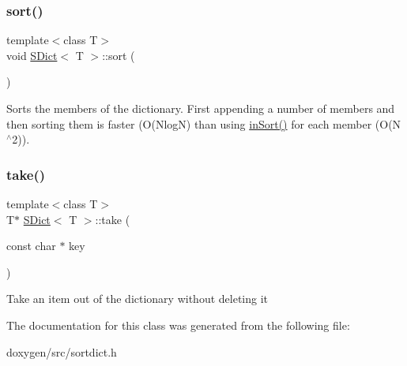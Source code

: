 \subsubsection{\texorpdfstring{sort()}{sort()}}
{\footnotesize\ttfamily template$<$class T$>$ \\
void \mbox{\hyperlink{class_s_dict}{S\+Dict}}$<$ T $>$\+::sort (\begin{DoxyParamCaption}{ }\end{DoxyParamCaption})\hspace{0.3cm}{\ttfamily [inline]}}

Sorts the members of the dictionary. First appending a number of members and then sorting them is faster (O(\+Nlog\+N) than using \mbox{\hyperlink{class_s_dict_a25a85aeba441b4c855ea7be25a4741b5}{in\+Sort()}} for each member (O(\+N$^\wedge$2)). \mbox{\label{class_s_dict_ac5aa2cf317cef817cf585efdab3663d7}} 
\subsubsection{\texorpdfstring{take()}{take()}}
{\footnotesize\ttfamily template$<$class T$>$ \\
T$\ast$ \mbox{\hyperlink{class_s_dict}{S\+Dict}}$<$ T $>$\+::take (\begin{DoxyParamCaption}\item[{const char $\ast$}]{key }\end{DoxyParamCaption})\hspace{0.3cm}{\ttfamily [inline]}}

Take an item out of the dictionary without deleting it 

The documentation for this class was generated from the following file\+:\begin{DoxyCompactItemize}
\item 
doxygen/src/sortdict.\+h\end{DoxyCompactItemize}
